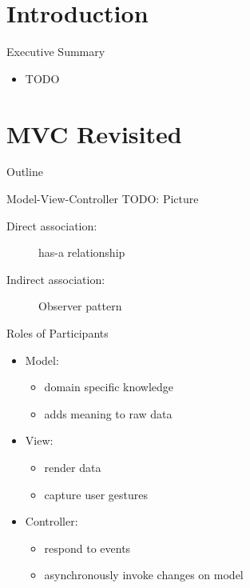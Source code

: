 \section*{Introduction}

\begin{frame}{Executive Summary}
  \begin{itemize}
  \item TODO
  \end{itemize}
\end{frame}


\section{MVC Revisited}

\begin{frame}{Outline}
  \tableofcontents[current]
\end{frame}

\begin{frame}{Model-View-Controller}
  TODO: Picture


  \begin{description}
  \item[Direct association:] has-a relationship
  \item[Indirect association:] Observer pattern
  \end{description}
\end{frame}

\begin{frame}{Roles of Participants}
  \begin{itemize}
  \item Model:
    \begin{itemize}
    \item domain specific knowledge
    \item adds meaning to raw data
    \end{itemize}
  \item View:
    \begin{itemize}
    \item render data
    \item capture user gestures
    \end{itemize}
  \item Controller:
    \begin{itemize}
    \item respond to events 
    \item asynchronously invoke changes on model
    \end{itemize}
  \end{itemize}
\end{frame}

